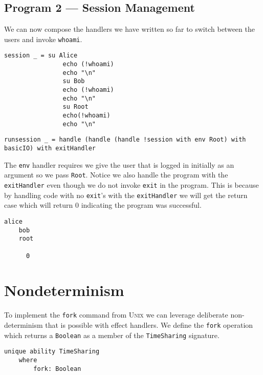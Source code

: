 \documentclass[logo,bsc,singlespacing,parskip]{infthesis}
\begin{document}
\begin{tcolorbox}[colback=gray!10, colframe=black, arc=0pt, outer arc=0pt]
  \section*{Program 2 --- Session Management}
  
  We can now compose the handlers we have written so far to switch between the
  users and invoke \texttt{whoami}.

  \begin{lstlisting}[language=unison]
    session _ = su Alice
                echo (!whoami)
                echo "\n"
                su Bob
                echo (!whoami)
                echo "\n"
                su Root
                echo(!whoami)
                echo "\n"
  \end{lstlisting}


  \begin{lstlisting}[language=unison]
    runsession _ = handle (handle (handle !session with env Root) with basicIO) with exitHandler
  \end{lstlisting}

  The \texttt{env} handler requires we give the user that is logged in
  initially as an argument so we pass \texttt{Root}. Notice we also handle the
  program with the \texttt{exitHandler} even though we do not invoke
  \texttt{exit} in the program. This is because by handling code with no \texttt{exit}'s
  with the \texttt{exitHandler} we will get the return case which will return 0
  indicating the program was successful.

  \begin{lstlisting}[style=terminal]
    alice
    bob
    root
      
      0
\end{lstlisting}
\end{tcolorbox}


\section{Nondeterminism}

To implement the \texttt{fork} command from \textsc{Unix} we can leverage
deliberate non-determinism that is possible with effect handlers. We define the
\texttt{fork} operation which returns a \texttt{Boolean} as a member of the
\texttt{TimeSharing} signature.

\begin{lstlisting}[language=unison]
unique ability TimeSharing
    where
        fork: Boolean
\end{lstlisting}
\end{document}
